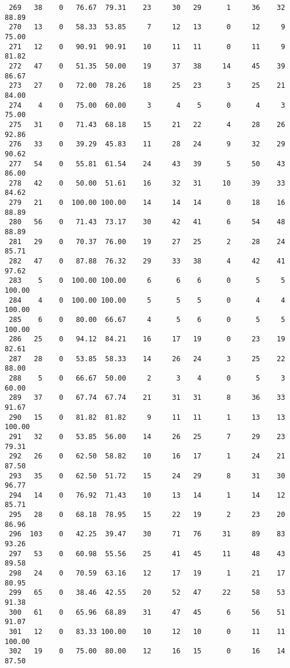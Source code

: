 \begin{verbatim}
 269   38    0   76.67  79.31    23     30   29      1     36    32    88.89
 270   13    0   58.33  53.85     7     12   13      0     12     9    75.00
 271   12    0   90.91  90.91    10     11   11      0     11     9    81.82
 272   47    0   51.35  50.00    19     37   38     14     45    39    86.67
 273   27    0   72.00  78.26    18     25   23      3     25    21    84.00
 274    4    0   75.00  60.00     3      4    5      0      4     3    75.00
 275   31    0   71.43  68.18    15     21   22      4     28    26    92.86
 276   33    0   39.29  45.83    11     28   24      9     32    29    90.62
 277   54    0   55.81  61.54    24     43   39      5     50    43    86.00
 278   42    0   50.00  51.61    16     32   31     10     39    33    84.62
 279   21    0  100.00 100.00    14     14   14      0     18    16    88.89
 280   56    0   71.43  73.17    30     42   41      6     54    48    88.89
 281   29    0   70.37  76.00    19     27   25      2     28    24    85.71
 282   47    0   87.88  76.32    29     33   38      4     42    41    97.62
 283    5    0  100.00 100.00     6      6    6      0      5     5   100.00
 284    4    0  100.00 100.00     5      5    5      0      4     4   100.00
 285    6    0   80.00  66.67     4      5    6      0      5     5   100.00
 286   25    0   94.12  84.21    16     17   19      0     23    19    82.61
 287   28    0   53.85  58.33    14     26   24      3     25    22    88.00
 288    5    0   66.67  50.00     2      3    4      0      5     3    60.00
 289   37    0   67.74  67.74    21     31   31      8     36    33    91.67
 290   15    0   81.82  81.82     9     11   11      1     13    13   100.00
 291   32    0   53.85  56.00    14     26   25      7     29    23    79.31
 292   26    0   62.50  58.82    10     16   17      1     24    21    87.50
 293   35    0   62.50  51.72    15     24   29      8     31    30    96.77
 294   14    0   76.92  71.43    10     13   14      1     14    12    85.71
 295   28    0   68.18  78.95    15     22   19      2     23    20    86.96
 296  103    0   42.25  39.47    30     71   76     31     89    83    93.26
 297   53    0   60.98  55.56    25     41   45     11     48    43    89.58
 298   24    0   70.59  63.16    12     17   19      1     21    17    80.95
 299   65    0   38.46  42.55    20     52   47     22     58    53    91.38
 300   61    0   65.96  68.89    31     47   45      6     56    51    91.07
 301   12    0   83.33 100.00    10     12   10      0     11    11   100.00
 302   19    0   75.00  80.00    12     16   15      0     16    14    87.50

\end{verbatim}
